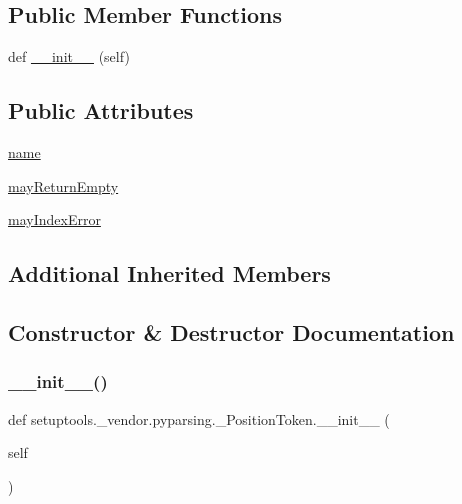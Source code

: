 \subsection*{Public Member Functions}
\begin{DoxyCompactItemize}
\item 
def \hyperlink{classsetuptools_1_1__vendor_1_1pyparsing_1_1__PositionToken_aac4710f156cf3b3ce54e6ecf6761ac83}{\+\_\+\+\_\+init\+\_\+\+\_\+} (self)
\end{DoxyCompactItemize}
\subsection*{Public Attributes}
\begin{DoxyCompactItemize}
\item 
\hyperlink{classsetuptools_1_1__vendor_1_1pyparsing_1_1__PositionToken_a7ed25157839d4f041dd84a5589363e82}{name}
\item 
\hyperlink{classsetuptools_1_1__vendor_1_1pyparsing_1_1__PositionToken_af2bfeadf9de030ff72baeb597c07a83e}{may\+Return\+Empty}
\item 
\hyperlink{classsetuptools_1_1__vendor_1_1pyparsing_1_1__PositionToken_aa27473a4eb2ec9033277ee6c3d69c8b9}{may\+Index\+Error}
\end{DoxyCompactItemize}
\subsection*{Additional Inherited Members}


\subsection{Constructor \& Destructor Documentation}
\mbox{\label{classsetuptools_1_1__vendor_1_1pyparsing_1_1__PositionToken_aac4710f156cf3b3ce54e6ecf6761ac83}} 
\subsubsection{\texorpdfstring{\+\_\+\+\_\+init\+\_\+\+\_\+()}{\_\_init\_\_()}}
{\footnotesize\ttfamily def setuptools.\+\_\+vendor.\+pyparsing.\+\_\+\+Position\+Token.\+\_\+\+\_\+init\+\_\+\+\_\+ (\begin{DoxyParamCaption}\item[{}]{self }\end{DoxyParamCaption})}



